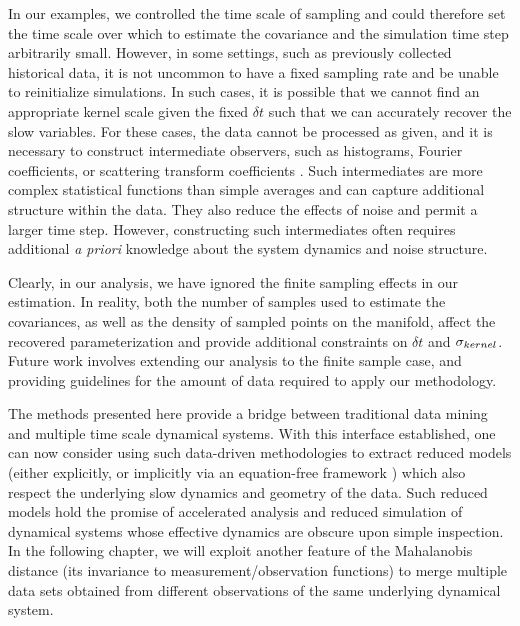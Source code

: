 In our examples, we controlled the time scale of sampling and could therefore set the time scale over which to estimate the covariance and the simulation time step arbitrarily small.
%
However, in some settings, such as previously collected historical data, it is not uncommon to have a fixed sampling rate and be unable to reinitialize simulations.
%
In such cases, it is possible that we cannot find an appropriate kernel scale given the fixed $\delta t$ such that we can accurately recover the slow variables.
%
For these cases, the data cannot be processed as given,
and it is necessary to construct intermediate observers,
such as histograms, Fourier coefficients, or scattering transform coefficients \cite{mallat2012group, talmon2014intrinsic, talmon2014manifold}.
%
Such intermediates are more complex statistical functions than simple averages and can capture additional structure within the data.
%
They also reduce the effects of noise and permit a larger time step.
%
However, constructing such intermediates often requires additional {\em a priori} knowledge about the system dynamics and noise structure.

Clearly, in our analysis, we have ignored the finite sampling effects in our estimation.
%
In reality, both the number of samples used to estimate the covariances, as well as the density of sampled points on the manifold, affect the recovered parameterization and provide additional constraints on $\delta t$ and $\sigma_{kernel}$.
%
Future work involves extending our analysis to the finite sample case, and providing guidelines for the amount of data required to apply our methodology.

The methods presented here provide a bridge between traditional data mining and multiple time scale dynamical systems.
%
With this interface established, one can now consider using such data-driven methodologies to extract reduced models (either explicitly, or implicitly via an equation-free framework \cite{erban2006gene, kevrekidis2004equation, kevrekidis2003equation,  kevrekidis2009equation}) which also respect the underlying slow dynamics and geometry of the data.
%
Such reduced models hold the promise of accelerated analysis and reduced simulation of dynamical systems whose effective dynamics are obscure upon simple inspection.
%
In the following chapter, we will exploit another feature of the Mahalanobis distance (its invariance to measurement/observation functions) to merge multiple data sets obtained from different observations of the same underlying dynamical system.
